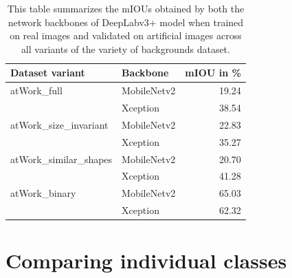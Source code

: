 	\begin{table}
		\centering
		\begin{tabular}{|l|l|r|}
		\hline
		\textbf{Dataset variant}  & \textbf{Backbone} & \multicolumn{1}{l|}{\textbf{mIOU in \%}} \\ \hline
		\multicolumn{ 1}{|l|}{atWork\_full} & MobileNetv2 & 19.24 \\ \cline{ 2- 3}
		\multicolumn{ 1}{|l|}{} & Xception & 38.54 \\ \hline
		\multicolumn{ 1}{|l|}{atWork\_size\_invariant} & MobileNetv2 & 22.83 \\ \cline{ 2- 3}
		\multicolumn{ 1}{|l|}{} & Xception & 35.27 \\ \hline
		\multicolumn{ 1}{|l|}{atWork\_similar\_shapes} & MobileNetv2 & 20.70 \\ \cline{ 2- 3}
		\multicolumn{ 1}{|l|}{} & Xception & 41.28 \\ \hline
		\multicolumn{ 1}{|l|}{atWork\_binary} & MobileNetv2 & 65.03 \\ \cline{ 2- 3}
		\multicolumn{ 1}{|l|}{} & Xception & 62.32 \\ \hline
		\end{tabular}
		\caption{This table summarizes the mIOUs obtained by both the network backbones of DeepLabv3+ model when trained on real images and validated on artificial images across all variants of the variety of backgrounds dataset.}
		\label{Table:realaug}
\end{table}


\section{Comparing individual classes}
\label{section:indcls}

